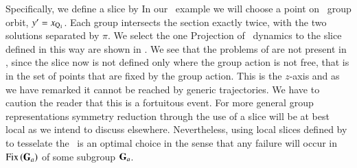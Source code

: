 Specifically, we define a slice by 
In our \cLe\ example we will choose a point on \reqv\ group orbit,
${y'}  = x_{\mathrm{Q}_{1}}$.
Each group intersects the section exactly twice,  with the
two solutions separated by $\pi$. We select the one 
 
Projection of \cLe\ dynamics to the slice defined in this way are
shown in . We see that the problems of
 are not present in , since
the slice now is not defined only where the group action is not free,
that is in the set of points that are fixed by the group action. This
is the $z$-axis and as we have remarked it cannot be reached by generic
trajectories. We have to caution the reader that this is a fortuitous
event. For more general group representations symmetry reduction through
the use of a slice will be at best local as we intend to discuss
elsewhere. Nevertheless, using local slices defined by 
to tesselate the \reducedsp\ is an optimal choice in the sense that any
failure will occur in \fixedsp\ $\mathrm{Fix}\left(\mathbf{G}_a\right)$ of some subgroup
$\mathbf{G}_a$.


